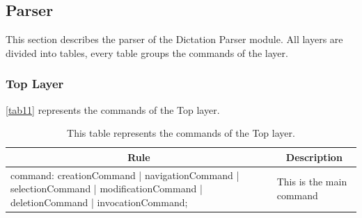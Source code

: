 \subsection{Parser}
This section describes the parser of the Dictation Parser module. All layers are divided into tables, every table groups the commands of the layer.

\subsubsection{Top Layer}
\autoref{tab11} represents the commands of the Top layer.
\begin{table}[H]
\centering
\begin{tabular}{|p{8cm}|p{7cm}|}
\hline
\multicolumn{1}{|c|}{{\bf Rule}}                                                                                             & \multicolumn{1}{c|}{{\bf Description}} \\ \hline
command: creationCommand | navigationCommand | selectionCommand | modificationCommand | deletionCommand | invocationCommand; & This is the main command               \\ \hline
\end{tabular}
\caption{This table represents the commands of the Top layer.}
\label{tab11}
\end{table}

